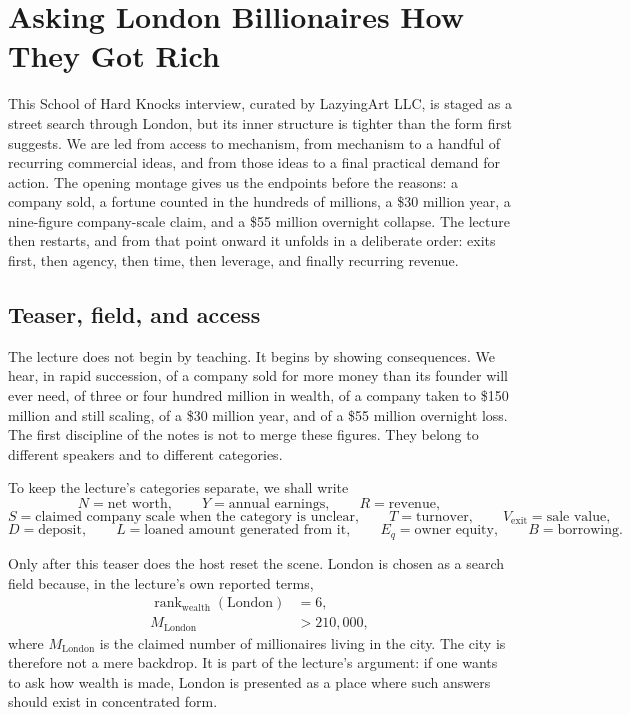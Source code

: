 \chapter{Asking London Billionaires How They Got Rich}

This School of Hard Knocks interview, curated by LazyingArt LLC, is staged as a street search through London, but its inner structure is tighter than the form first suggests. We are led from access to mechanism, from mechanism to a handful of recurring commercial ideas, and from those ideas to a final practical demand for action. The opening montage gives us the endpoints before the reasons: a company sold, a fortune counted in the hundreds of millions, a \$30 million year, a nine-figure company-scale claim, and a \$55 million overnight collapse. The lecture then restarts, and from that point onward it unfolds in a deliberate order: exits first, then agency, then time, then leverage, and finally recurring revenue.

\section{Teaser, field, and access}

The lecture does not begin by teaching. It begins by showing consequences. We hear, in rapid succession, of a company sold for more money than its founder will ever need, of three or four hundred million in wealth, of a company taken to \$150 million and still scaling, of a \$30 million year, and of a \$55 million overnight loss. The first discipline of the notes is not to merge these figures. They belong to different speakers and to different categories.

\begin{definition}
To keep the lecture's categories separate, we shall write
\[
N = \text{net worth}, \qquad
Y = \text{annual earnings}, \qquad
R = \text{revenue},
\]
\[
S = \text{claimed company scale when the category is unclear}, \qquad
T = \text{turnover}, \qquad
V_{\mathrm{exit}} = \text{sale value},
\]
\[
D = \text{deposit}, \qquad
L = \text{loaned amount generated from it}, \qquad
E_q = \text{owner equity}, \qquad
B = \text{borrowing}.
\]
\end{definition}

Only after this teaser does the host reset the scene. London is chosen as a search field because, in the lecture's own reported terms,
\begin{align}
\operatorname{rank}_{\text{wealth}}(\text{London}) &= 6,\\
M_{\text{London}} &> 210{,}000,
\end{align}
where \(M_{\text{London}}\) is the claimed number of millionaires living in the city. The city is therefore not a mere backdrop. It is part of the lecture's argument: if one wants to ask how wealth is made, London is presented as a place where such answers should exist in concentrated form.

